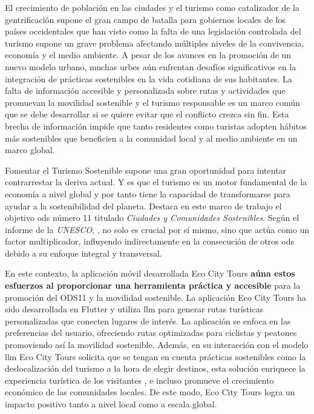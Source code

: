 
El crecimiento de población en las ciudades \cite{nieuwenhuijsen_urban_2020} y el turismo como catalizador de la gentrificación supone el gran campo de batalla para gobiernos locales de los países occidentales que han visto como la falta de una legislación controlada del turismo supone un grave problema afectando múltiples niveles de la convivencia, economía y el medio ambiente. A pesar de los avances en la promoción de un nuevo modelo urbano, muchas urbes aún enfrentan desafíos significativos en la integración de prácticas sostenibles en la vida cotidiana de sus habitantes. La falta de información accesible y personalizada sobre rutas y actividades que promuevan la movilidad sostenible y el turismo responsable es un marco común que se debe desarrollar si se quiere evitar que el conflicto crezca sin fin. Esta brecha de información impide que tanto residentes como turistas adopten hábitos más sostenibles que beneficien a la comunidad local y al medio ambiente en un marco global.

Fomentar el Turismo Sostenible supone una gran oportunidad para intentar contrarrestar la deriva actual. Y es que el turismo es un motor fundamental de la economía a nivel global y por tanto tiene la capacidad de transformarse para ayudar a la sostenibilidad del planeta.  Destaca en este marco de trabajo el  objetivo \acrshort{ods} número 11 titulado \textit{Ciudades y Comunidades Sostenibles}. Según el informe de la \textit{UNESCO}, \cite{ionescu_progress_2024}, no solo es crucial por sí mismo, sino que actúa como un factor multiplicador, influyendo indirectamente en la consecución de otros \acrshort{ods} debido a su enfoque integral y transversal.

En este contexto, la aplicación móvil desarrollada Eco City Tours \textbf{aúna estos esfuerzos al proporcionar una herramienta práctica y accesible} para la promoción del ODS11 y la movilidad sostenible. La aplicación Eco City Tours ha sido  desarrollada en Flutter y utiliza \acrfull{llm} para generar rutas turísticas personalizadas que conecten lugares de interés. La aplicación se enfoca en las preferencias del usuario, ofreciendo rutas optimizadas para ciclistas y peatones promoviendo así la movilidad sostenible. Además, en su interacción con el modelo \acrshort{llm} Eco City Tours solicita que se tengan en cuenta prácticas sostenibles como la deslocalización del turismo a la hora de elegir destinos, esta solución enriquece la experiencia turística de los visitantes \cite{mitas_tell_2023}, e incluso promueve el crecimiento económico de las comunidades locales. De este modo, Eco City Tours logra un impacto positivo tanto a nivel local como a escala global.